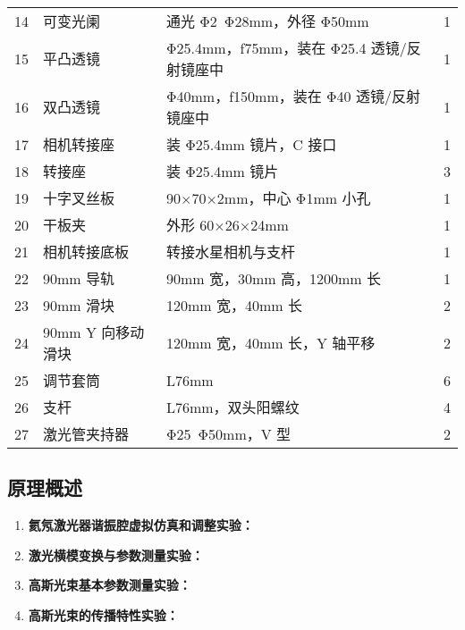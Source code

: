 \documentclass[dvipsnames, svgnames,a4paper,11pt]{article}
\begin{document}
\begin{longtable}{p{}|p{}|p{}|p{}}
	14 & 可变光阑 & 通光 Φ2~Φ28mm，外径 Φ50mm  & 1	\\

	15 & 平凸透镜 & Φ25.4mm，f75mm，装在 Φ25.4 透镜/反射镜座中  & 1	\\

	16 & 双凸透镜 & Φ40mm，f150mm，装在 Φ40 透镜/反射镜座中  & 1	\\

	17 & 相机转接座 & 装 Φ25.4mm 镜片，C 接口  & 1	\\

	18 & 转接座 & 装 Φ25.4mm 镜片  & 3	\\

	19 & 十字叉丝板 & 90×70×2mm，中心 Φ1mm 小孔  & 1	\\

	20 & 干板夹 & 外形 60×26×24mm  & 1	\\

	21 & 相机转接底板 & 转接水星相机与支杆  & 1	\\

	22 & 90mm 导轨 & 90mm 宽，30mm 高，1200mm 长  & 1	\\

	23 & 90mm 滑块 & 120mm 宽，40mm 长  & 2	\\

	24 & 90mm Y 向移动滑块 & 120mm 宽，40mm 长，Y 轴平移  & 2	\\

	25 & 调节套筒 & L76mm  & 6	\\
	
	26 & 支杆 & L76mm，双头阳螺纹  & 4	\\

	27 & 激光管夹持器 & Φ25~Φ50mm，V 型  & 2	\\
\end{longtable}





\subsection{原理概述}

	\begin{enumerate}
		\item \textbf{氦氖激光器谐振腔虚拟仿真和调整实验：}




		\item \textbf{激光横模变换与参数测量实验：}
		





		\item \textbf{高斯光束基本参数测量实验：}
		





		\item \textbf{高斯光束的传播特性实验：}
		




	\end{enumerate}
	
\end{document}
